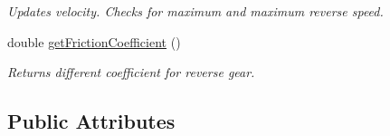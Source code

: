 \begin{DoxyCompactItemize}
\begin{DoxyCompactList}\small\item\em Updates velocity. Checks for maximum and maximum reverse speed. \end{DoxyCompactList}\item 
\hypertarget{class_car_a47fe72f08097245751cd5c6eea31a9cb}{}double \hyperlink{class_car_a47fe72f08097245751cd5c6eea31a9cb}{get\+Friction\+Coefficient} ()\label{class_car_a47fe72f08097245751cd5c6eea31a9cb}

\begin{DoxyCompactList}\small\item\em Returns different coefficient for reverse gear. \end{DoxyCompactList}\end{DoxyCompactItemize}
\subsection*{Public Attributes}
